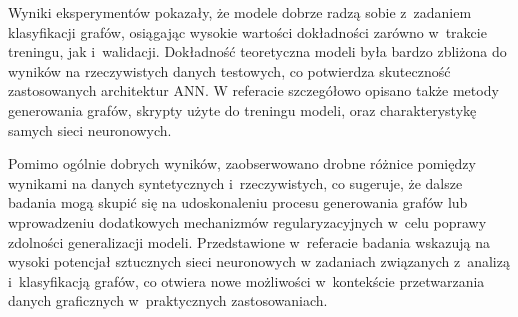 
Wyniki eksperymentów pokazały, że modele dobrze radzą sobie z~zadaniem klasyfikacji grafów,
osiągając wysokie wartości dokładności zarówno w~trakcie treningu, jak i~walidacji.
Dokładność teoretyczna modeli była bardzo zbliżona do wyników na rzeczywistych danych testowych,
co potwierdza skuteczność zastosowanych architektur ANN.
W referacie szczegółowo opisano także metody generowania grafów,
skrypty użyte do treningu modeli, oraz charakterystykę samych sieci neuronowych.

Pomimo ogólnie dobrych wyników,
zaobserwowano drobne różnice pomiędzy wynikami na danych syntetycznych i~rzeczywistych,
co sugeruje, że dalsze badania mogą skupić się na udoskonaleniu procesu generowania grafów
lub wprowadzeniu dodatkowych mechanizmów regularyzacyjnych w~celu poprawy zdolności generalizacji modeli.
Przedstawione w~referacie badania wskazują na wysoki potencjał sztucznych sieci neuronowych
w zadaniach związanych z~analizą i~klasyfikacją grafów,
co otwiera nowe możliwości w~kontekście przetwarzania danych graficznych w~praktycznych zastosowaniach.